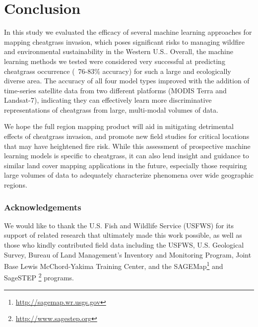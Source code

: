 \documentclass{article} %
\begin{document}
\section{Conclusion}
In this study we evaluated the efficacy of several machine learning approaches for mapping cheatgrass invasion, which poses significant risks to managing wildfire and environmental sustainability in the Western U.S.. %
Overall, the machine learning methods we tested were considered very successful at predicting cheatgrass occurrence (~76-83\% accuracy) for such a large and ecologically diverse area. %
The accuracy of all four model types improved with the addition of time-series satellite data from two different platforms (MODIS Terra and Landsat-7), indicating they can effectively learn more discriminative representations of cheatgrass from large, multi-modal volumes of data.

We hope
the full region mapping product will aid in mitigating detrimental effects of cheatgrass invasion, and promote
new field studies for critical locations that may have heightened fire risk.
While this assessment of prospective machine learning models is specific to cheatgrass, it can also lend
insight and guidance to similar land cover mapping applications in the future, especially those requiring large volumes of data to adequately characterize phenomena over wide geographic regions. 

\subsubsection*{Acknowledgements}
We would like to thank the U.S. Fish and Wildlife Service (USFWS) for its support of related research that ultimately made this work possible, as well as those who kindly contributed field data including the USFWS, U.S. Geological Survey, Bureau of Land Management’s Inventory and Monitoring Program, Joint Base Lewis McChord-Yakima Training Center, and the SAGEMap\footnote{\url{http://sagemap.wr.usgs.gov}} and SageSTEP \footnote{\url{http://www.sagestep.org}} programs.


\end{document}
